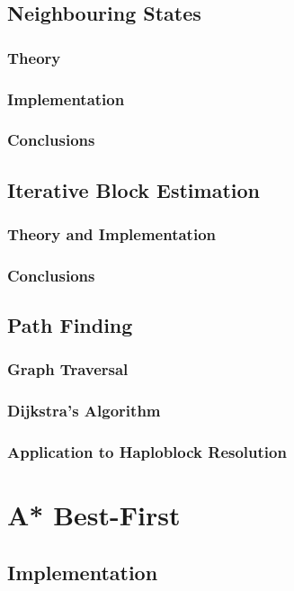 \subsection{Neighbouring States}
\subsubsection{Theory}
\subsubsection{Implementation}
\subsubsection{Conclusions}

\subsection{Iterative Block Estimation}
\subsubsection{Theory and Implementation}
\subsubsection{Conclusions}

\subsection{Path Finding}
\subsubsection{Graph Traversal}
\subsubsection{Dijkstra's Algorithm}
\subsubsection{Application to Haploblock Resolution}

\section{A* Best-First}
\subsection{Implementation}

